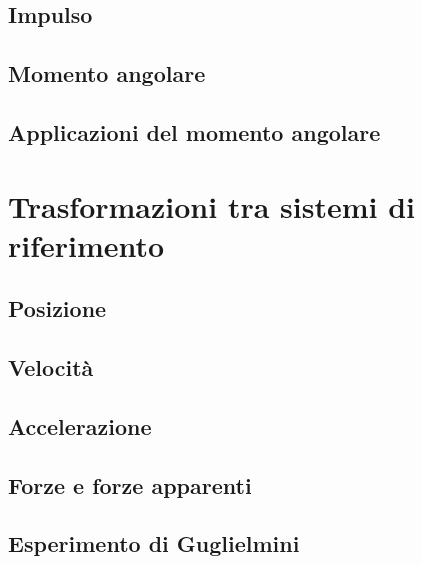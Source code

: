 \documentclass[a4paper]{article}
\begin{document}
\subsection{Impulso}
\subsection{Momento angolare}
\subsection{Applicazioni del momento angolare}

\section{Trasformazioni tra sistemi di riferimento}
\subsection{Posizione}
\subsection{Velocità}
\subsection{Accelerazione}
\subsection{Forze e forze apparenti}
\subsection{Esperimento di Guglielmini}
\end{document}
